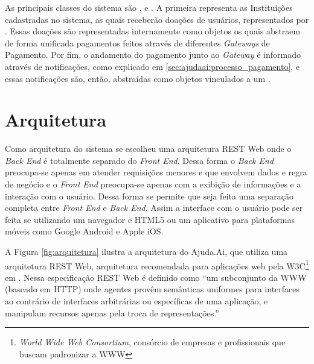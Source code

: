 As principais classes do sistema são ,  e . A primeira representa as Instituições cadastradas no sistema, as quais receberão doações de usuários, representados por . Essas doações são representadas internamente como objetos  os quais abstraem de forma unificada pagamentos feitos através de diferentes \emph{Gateways} de Pagamento. Por fim, o andamento do pagamento junto ao \emph{Gateway} é informado através de notificações, como explicado em \ref{sec:ajudaai:processo_pagamento}, e essas notificações são, então, abstraídas como objetos  vinculados a um .







\section{Arquitetura} \label{sec:ajudaai:arquitetura}

Como arquitetura do sistema se escolheu uma arquitetura REST Web onde o \emph{Back End} é totalmente separado do \emph{Front End}. Dessa forma o \emph{Back End} preocupa-se apenas em atender requisições menores e que envolvem dados e regra de negócio e o \emph{Front End} preocupa-se apenas com a exibição de informações e a interação com o usuário. Dessa forma se permite que seja feita uma separação completa entre \emph{Front End} e \emph{Back End}. Assim a interface com o usuário pode ser feita se utilizando um navegador e HTML5 ou um aplicativo para plataformas móveis como Google Android e Apple iOS.

A Figura \ref{fig:arquitetura} ilustra a arquitetura do Ajuda.Ai, que utiliza uma arquitetura REST Web, arquitetura recomendada para aplicações web pela W3C\footnote{\emph{World Wide Web Consortium}, consórcio de empresas e profissionais que buscam padronizar a WWW} em \cite{booth2004webservices}. Nessa especificação REST Web é definido como ``um subconjunto da WWW (baseado em HTTP) onde agentes provêm semânticas uniformes para interfaces ao contrário de interfaces arbitrárias ou específicas de uma aplicação, e manipulam recursos apenas pela troca de representações.''

